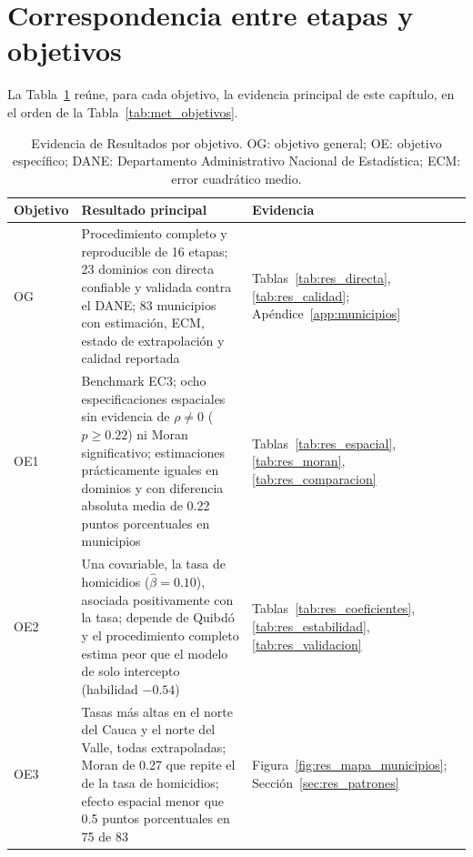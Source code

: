 \section{Correspondencia entre etapas y objetivos}
\label{sec:res_objetivos}

La Tabla~\ref{tab:res_objetivos} reúne, para cada objetivo, la evidencia principal de este capítulo, en el orden de la Tabla~\ref{tab:met_objetivos}.

\begin{table}[!htbp]
\centering
\small
\caption{Evidencia de Resultados por objetivo. OG: objetivo general; OE: objetivo específico; DANE: Departamento Administrativo Nacional de Estadística; ECM: error cuadrático medio.}
\label{tab:res_objetivos}
\begin{tabularx}{\linewidth}{>{\raggedright\arraybackslash}p{1.4cm} >{\raggedright\arraybackslash}X >{\raggedright\arraybackslash}p{3.4cm}}
\toprule
Objetivo & Resultado principal & Evidencia \\
\midrule
OG & Procedimiento completo y reproducible de 16 etapas; 23 dominios con directa confiable y validada contra el DANE; 83 municipios con estimación, ECM, estado de extrapolación y calidad reportada & Tablas~\ref{tab:res_directa}, \ref{tab:res_calidad}; Apéndice~\ref{app:municipios} \\
OE1 & Benchmark EC3; ocho especificaciones espaciales sin evidencia de $\rho \neq 0$ ($p \geq 0.22$) ni Moran significativo; estimaciones prácticamente iguales en dominios y con diferencia absoluta media de 0.22 puntos porcentuales en municipios & Tablas~\ref{tab:res_espacial}, \ref{tab:res_moran}, \ref{tab:res_comparacion} \\
OE2 & Una covariable, la tasa de homicidios ($\hat{\beta} = 0.10$), asociada positivamente con la tasa; depende de Quibdó y el procedimiento completo estima peor que el modelo de solo intercepto (habilidad $-0.54$) & Tablas~\ref{tab:res_coeficientes}, \ref{tab:res_estabilidad}, \ref{tab:res_validacion} \\
OE3 & Tasas más altas en el norte del Cauca y el norte del Valle, todas extrapoladas; Moran de 0.27 que repite el de la tasa de homicidios; efecto espacial menor que 0.5 puntos porcentuales en 75 de 83 & Figura~\ref{fig:res_mapa_municipios}; Sección~\ref{sec:res_patrones} \\
\bottomrule
\end{tabularx}
\end{table}
\FloatBarrier
